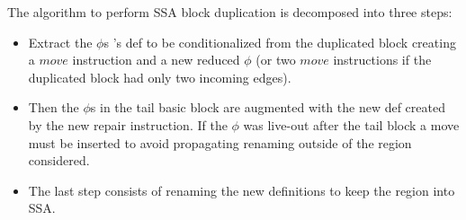 The algorithm to perform SSA block duplication is decomposed into three steps: 
\begin{itemize}
\item Extract the $\phi$s 's def to be conditionalized from the duplicated block creating a $move$ instruction and a new reduced $\phi$ (or two $move$ instructions if the duplicated block had only two incoming edges).
\item Then the $\phi$s in the tail basic block are augmented with the new def created by the new repair instruction. If the $\phi$ was live-out after the tail block a move must be inserted to avoid propagating renaming outside of the region considered. 
\item The last step consists of renaming the new definitions to keep the region into SSA.
\end{itemize}

